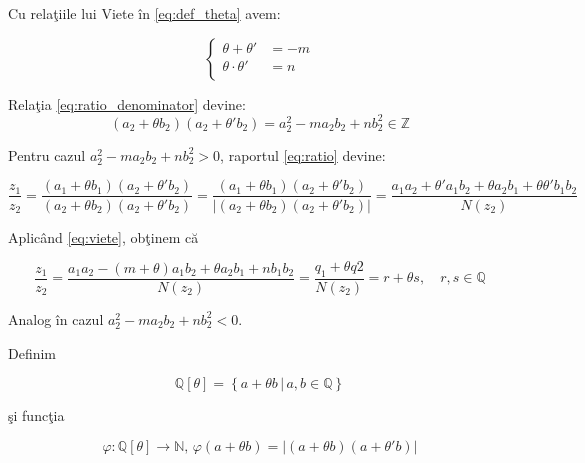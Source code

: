 \documentclass[12pt]{article}
\begin{document}
Cu relaţiile lui Viete în \eqref{eq:def_theta} avem:

\begin{equation} \label{eq:viete}
    \begin{cases}
    \theta + \theta' &= -m \\
    \theta \cdot \theta' &= n \\
    \end{cases}
\end{equation}

Relaţia \eqref{eq:ratio_denominator} devine:
\begin{equation}
    (a_2 + \theta b_2)(a_2 + \theta' b_2) = a_2^2 - m a_2 b_2 + n b_2^2 \in \mathbb{Z}
\end{equation}

Pentru cazul $a_2^2 - m a_2 b_2 + n b_2^2 > 0$, raportul \eqref{eq:ratio} devine:

\begin{equation} \label{eq:ratio_a}
    \frac{z_1}{z_2} = \frac{(a_1 + \theta b_1)(a_2 + \theta' b_2)}{(a_2 + \theta b_2)(a_2 + \theta' b_2)} 
    =  \frac{(a_1 + \theta b_1)(a_2 + \theta' b_2)}{|(a_2 + \theta b_2)(a_2 + \theta' b_2)|} 
    = \frac{a_1 a_2 + \theta' a_1 b_2 + \theta a_2 b_1 + \theta \theta' b_1b_2}{N(z_2)}
\end{equation}

Aplicând \eqref{eq:viete}, obţinem că

\begin{equation} \label{eq:ratio_a_viete}
    \frac{z_1}{z_2} =
    \frac{a_1 a_2 - (m + \theta) a_1 b_2 + \theta a_2 b_1 + n b_1b_2}{N(z_2)} =
    \frac{q_1 + \theta q2}{N(z_2)} = 
    r + \theta s, \quad r, s \in \mathbb{Q}
\end{equation}

Analog în cazul $a_2^2 - m a_2 b_2 + n b_2^2 < 0$.

\vspace{.4cm}
Definim

\begin{equation} \label{eq:def_q_theta}
    \mathbb{Q}[\theta] = \left\{ a + \theta b \,|\, a, b \in \mathbb{Q} \right\}
\end{equation}

şi funcţia

\begin{equation} \label{eq:def_phi}
    \varphi : \mathbb{Q}[\theta] \to \mathbb{N}, \, \varphi(a + \theta b) = |(a + \theta b)(a + \theta' b)|
\end{equation}
\end{document}
